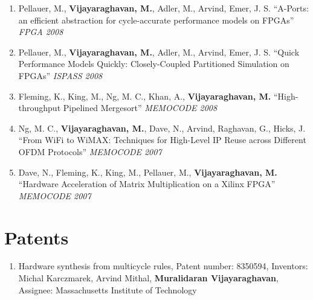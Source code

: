 \documentclass[margin]{resume}
\begin{document}
\begin{resume}
\begin{enumerate}
    \item Pellauer, M.,
    \textbf{Vijayaraghavan, M.}, Adler, M., Arvind, Emer, J. S. ``A-Ports: an
    efficient abstraction for cycle-accurate performance models on FPGAs''
    \textit{FPGA 2008}
    \item Pellauer, M., \textbf{Vijayaraghavan, M.}, Adler, M., Arvind, Emer,
    J. S. ``Quick Performance Models Quickly: Closely-Coupled Partitioned
    Simulation on FPGAs'' \textit{ISPASS 2008}
    \item Fleming, K., King, M., Ng, M. C., Khan, A., \textbf{Vijayaraghavan, M.} ``High-throughput Pipelined Mergesort'' \textit{MEMOCODE 2008}
    \item Ng, M. C., \textbf{Vijayaraghavan, M.}, Dave, N., Arvind, Raghavan, G., Hicks, J. ``From WiFi to WiMAX: Techniques for High-Level IP Reuse across Different OFDM Protocols'' \textit{MEMOCODE 2007}
    \item Dave, N., Fleming, K., King, M., Pellauer, M., \textbf{Vijayaraghavan, M.} ``Hardware Acceleration of Matrix Multiplication on a Xilinx FPGA'' \textit{MEMOCODE 2007}
    \end{enumerate}

	\section{\mysidestyle Patents}
  \begin{enumerate}
	\item Hardware synthesis from multicycle rules, Patent number: 8350594, Inventors: Michal Karczmarek, Arvind Mithal, \textbf{Muralidaran Vijayaraghavan}, Assignee: Massachusetts Institute of Technology
	\end{enumerate}

%

\end{resume}
\end{document}
